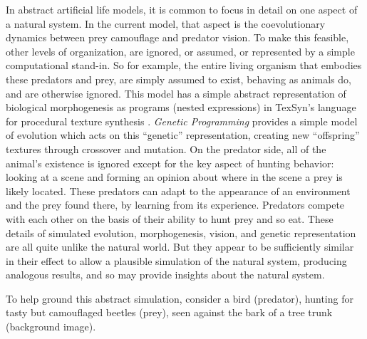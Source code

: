\documentclass[letterpaper]{article}
\newcommand{\jargon}[1]{\textit{#1}}
\newcommand{\texsyn}[0]{TexSyn}
\begin{document}
In abstract artificial life models, it is common to focus in detail on one aspect of a natural system. In the current model, that aspect is the coevolutionary dynamics between prey camouflage and predator vision. To make this feasible, other levels of organization, are ignored, or assumed, or represented by a simple computational stand-in. So for example, the entire living organism that embodies these predators and prey, are simply assumed to exist, behaving as animals do, and are otherwise ignored. This model has a simple abstract representation of biological morphogenesis as programs (nested expressions) in \texsyn{}'s language for procedural texture synthesis \cite{reynolds_texsyn_2019}. \jargon{Genetic Programming} provides a simple model of evolution which acts on this “genetic” representation, creating new “offspring” textures through crossover and mutation. On the predator side, all of the animal's existence is ignored except for the key aspect of hunting behavior: looking at a scene and forming an opinion about where in the scene a prey is likely located. These predators can adapt to the appearance of an environment and the prey found there, by learning from its experience. Predators compete with each other on the basis of their ability to hunt prey and so eat. These details of simulated evolution, morphogenesis, vision, and genetic representation are all quite unlike the natural world. But they appear to be sufficiently similar in their effect to allow a plausible simulation of the natural system, producing analogous results, and so may provide insights about the natural system.
\par
To help ground this abstract simulation, consider a bird (predator), hunting for tasty but camouflaged beetles (prey), seen against the bark of a tree trunk (background image).
\par

\end{document}
